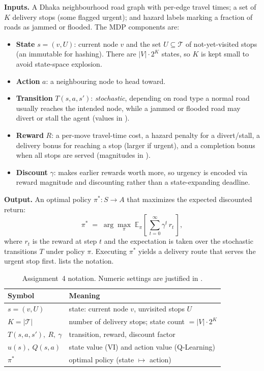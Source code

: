 \documentclass{ai-lab-report}
\begin{document}
\textbf{Inputs.} A Dhaka neighbourhood road graph with per-edge travel times; a set of $K$ delivery stops (some flagged urgent); and hazard labels marking a fraction of roads as jammed or flooded. The MDP components are:
\begin{itemize}
  \item \textbf{State} $s=(v,U)$: current node $v$ and the set $U\subseteq\mathcal T$ of not-yet-visited stops (an immutable  for hashing). There are $|V|\cdot 2^{K}$ states, so $K$ is kept small to avoid state-space explosion.
  \item \textbf{Action} $a$: a neighbouring node to head toward.
  \item \textbf{Transition} $T(s,a,s')$: \emph{stochastic}, depending on road type a normal road usually reaches the intended node, while a jammed or flooded road may divert or stall the agent (values in ).
  \item \textbf{Reward} $R$: a per-move travel-time cost, a hazard penalty for a divert/stall, a delivery bonus for reaching a stop (larger if urgent), and a completion bonus when all stops are served (magnitudes in ).
  \item \textbf{Discount} $\gamma$: makes earlier rewards worth more, so urgency is encoded via reward magnitude and discounting rather than a state-expanding deadline.
\end{itemize}
\textbf{Output.} An optimal policy $\pi^\ast: S\to A$ that maximizes the expected discounted return:
\begin{equation}
\pi^\ast \;=\; \arg\max_{\pi}\; \mathbb{E}_{\pi}\!\left[\,\sum_{t=0}^{\infty} \gamma^{t}\, r_t\,\right],
\label{eq:mdpobj}
\end{equation}
where $r_t$ is the reward at step $t$ and the expectation is taken over the stochastic transitions $T$ under policy $\pi$. Executing $\pi^\ast$ yields a delivery route that serves the urgent stop first.  lists the notation.

\begin{table}[H]
\centering
\small
\begin{tabularx}{\linewidth}{@{}lX@{}}
\toprule
Symbol & Meaning \\
\midrule
$s=(v,U)$ & state: current node $v$, unvisited stops $U$ \\
$K=|\mathcal T|$ & number of delivery stops; state count $=|V|\cdot2^{K}$ \\
$T(s,a,s'),\ R,\ \gamma$ & transition, reward, discount factor \\
$u(s),\ Q(s,a)$ & state value (VI) and action value (Q-Learning) \\
$\pi^\ast$ & optimal policy (state $\mapsto$ action) \\
\bottomrule
\end{tabularx}
\caption{Assignment~4 notation. Numeric settings are justified in .}
\label{tab:a4notation}
\end{table}
\end{document}
